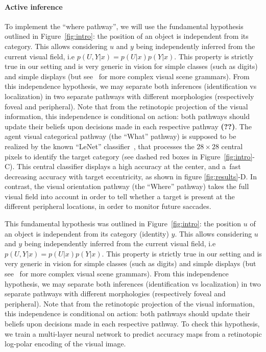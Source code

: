 \paragraph{Active inference}
To implement the ``where pathway'', we will use the fundamental hypothesis outlined in Figure~\ref{fig:intro}: the position of an object is independent from its category.  This allows considering $u$ and $y$ being independently inferred from the current visual field, i.e $p(U,Y|x) = p(U|x) p(Y|x)$. This property is strictly true in our setting and is very generic in vision for simple classes (such as digits) and simple displays (but see~\citep{Vo12} for more complex visual scene grammars). 
From this independence hypothesis, we may separate both inferences (identification vs localization) in two separate pathways with different morphologies (respectively foveal and peripheral). Note that from the retinotopic projection of the visual information, this independence is conditional on action: both pathways should update their beliefs upon decisions made in each respective pathway {\bf (??)}.
The agent visual categorical pathway (the ``What'' pathway) is supposed to be realized by the known ``LeNet'' classifier~\citep{Lecun1998}, that processes the $28 \times 28$ central pixels to identify the target category (see dashed red boxes in  Figure~\ref{fig:intro}-C). This central classifier displays a high accuracy at the center, and a fast decreasing accuracy with target eccentricity, as shown in figure \ref{fig:results}-D. In contrast, the visual orientation pathway (the ``Where'' pathway) takes the full visual field into account in order to tell whether a target is present at the different peripheral locations, in order to monitor future saccades.


This fundamental hypothesis was outlined in Figure~\ref{fig:intro}: the position $u$ of an object is independent from its category (identity) $y$. This allows considering $u$ and $y$ being independently inferred from the current visual field, i.e $p(U,Y|x) = p(U|x) p(Y|x)$. This property is strictly true in our setting and is very generic in vision for simple classes (such as digits) and simple displays (but see~\citep{Vo12} for more complex visual scene grammars). 
From this independence hypothesis, we may separate both inferences (identification vs localization) in two separate pathways with different morphologies (respectively foveal and peripheral). Note that from the retinotopic projection of the visual information, this independence is conditional on action: both pathways should update their beliefs upon decisions made in each respective pathway.
To check this hypothesis, we train a multi-layer neural network to predict accuracy maps from a retinotopic log-polar encoding of the visual image. 

